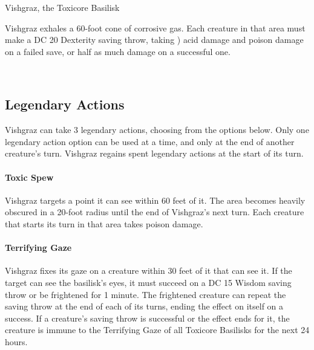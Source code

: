 \documentclass[letterpaper,openany,twoside,twocolumn]{book}
\begin{document}
\begin{DndMonster}[width=0.5\textwidth]{Vishgraz, the Toxicore Basilisk}
    \DndMonsterAttack[
      name=Vicious Maw,
      distance=melee, %
      mod=+14,
      reach=10,
      targets=one target,
      dmg=\DndDice{3d6 + 7},
      dmg-type=slashing,
      or-dmg=\DndDice{6d6 + 7},
      or-dmg-when={if creature is already poisoned},
    ]
    
	Vishgraz exhales a 60-foot cone of corrosive gas. Each creature in that area must make a DC 20 Dexterity saving throw, taking ) acid damage and  poison damage on a failed save, or half as much damage on a successful one.
      
\end{DndMonster}

\vfill\eject %

\hfil\\\vspace*{5cm}
\subsection*{Legendary Actions}
Vishgraz can take 3 legendary actions, choosing from the options below. Only one legendary action option can be used at a time, and only at the end of another creature's turn. Vishgraz regains spent legendary actions at the start of its turn.
\paragraph{Toxic Spew} Vishgraz targets a point it can see within 60 feet of it. The area becomes heavily obscured in a 20-foot radius until the end of Vishgraz's next turn. Each creature that starts its turn in that area takes  poison damage.
\paragraph{Terrifying Gaze} Vishgraz fixes its gaze on a creature within 30 feet of it that can see it. If the target can see the basilisk's eyes, it must succeed on a DC 15 Wisdom saving throw or be frightened for 1 minute. The frightened creature can repeat the saving throw at the end of each of its turns, ending the effect on itself on a success. If a creature's saving throw is successful or the effect ends for it, the creature is immune to the Terrifying Gaze of all Toxicore Basilisks for the next 24 hours.
\end{document}
